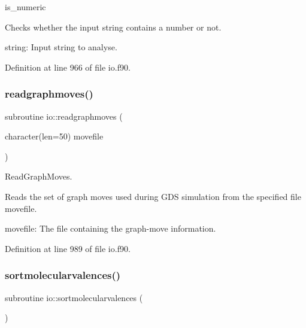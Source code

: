 is\+\_\+numeric 

Checks whether the input string contains a number or not.


\begin{DoxyItemize}
\item string\+: Input string to analyse. 
\end{DoxyItemize}

Definition at line 966 of file io.\+f90.

\mbox{\label{namespaceio_a19211eac027eb30d7c602fb5583351e0}} 
\subsubsection{\texorpdfstring{readgraphmoves()}{readgraphmoves()}}
{\footnotesize\ttfamily subroutine io\+::readgraphmoves (\begin{DoxyParamCaption}\item[{character(len=50)}]{movefile }\end{DoxyParamCaption})}



Read\+Graph\+Moves. 

Reads the set of graph moves used during G\+DS simulation from the specified file \textquotesingle{}movefile\textquotesingle{}.


\begin{DoxyItemize}
\item movefile\+: The file containing the graph-\/move information. 
\end{DoxyItemize}

Definition at line 989 of file io.\+f90.

\mbox{\label{namespaceio_a0de73eea344ac9978f7cbb7d80c6ab2c}} 
\subsubsection{\texorpdfstring{sortmolecularvalences()}{sortmolecularvalences()}}
{\footnotesize\ttfamily subroutine io\+::sortmolecularvalences (\begin{DoxyParamCaption}{ }\end{DoxyParamCaption})}



